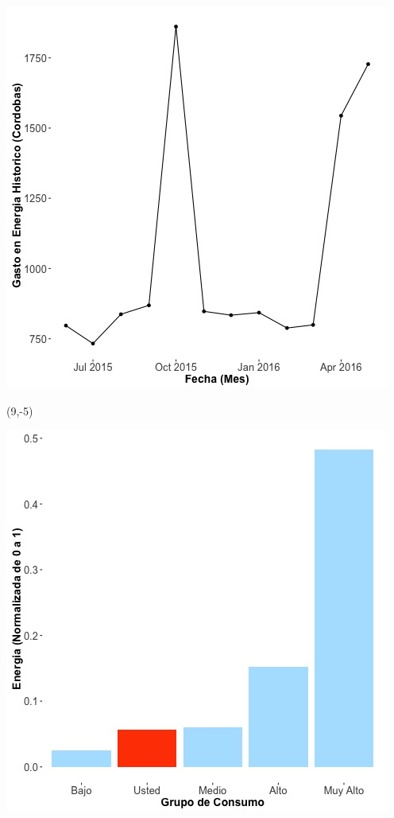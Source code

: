 \documentclass{article}\usepackage[]{graphicx}\usepackage[]{color}
\newenvironment{knitrout}{}{} %
\begin{document}
\begin{knitrout}
\color{fgcolor}
\includegraphics[scale=0.65]{figure/A6_historico_cordobas} 
\end{knitrout}

 \begin{textblock}{1}(9,-5)
\begin{minipage}{20em}
\begingroup

\endgroup
\end{minipage}
\end{textblock}


\begin{knitrout}
\color{fgcolor}
\includegraphics[scale=0.65]{figure/A6_neighbor_plot} 
\end{knitrout}
\end{document}
